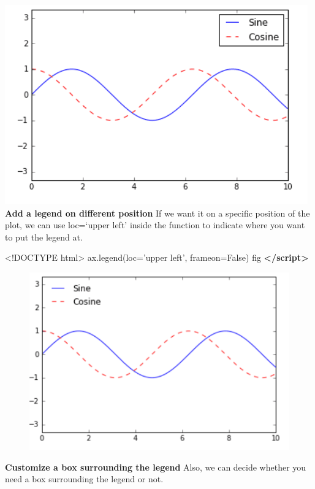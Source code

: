 \documentclass[]{book}
\newenvironment{Shaded}{\begin{snugshade}}{\end{snugshade}}
\newcommand{\KeywordTok}[1]{\textcolor[rgb]{0.13,0.29,0.53}{\textbf{#1}}}
\newcommand{\DataTypeTok}[1]{\textcolor[rgb]{0.13,0.29,0.53}{#1}}
\newcommand{\NormalTok}[1]{#1}
\theoremstyle{definition}
\theoremstyle{definition}
\theoremstyle{definition}
\theoremstyle{remark}
\begin{document}
\includegraphics{images/legend1.png} \textbf{Add a legend on different
position} If we want it on a specific position of the plot, we can use
loc=`upper left' inside the function to indicate where you want to put
the legend at.

\begin{Shaded}
\begin{Highlighting}[]
\DataTypeTok{<!DOCTYPE }\NormalTok{html}\DataTypeTok{>}
\NormalTok{ax.legend(loc='upper left', frameon=False)}
\NormalTok{fig}
\KeywordTok{</script>}
\end{Highlighting}
\end{Shaded}

\begin{figure}
\centering
\includegraphics{images/legend2.png}
\caption{}
\end{figure}

\textbf{Customize a box surrounding the legend} Also, we can decide
whether you need a box surrounding the legend or not.
\end{document}
